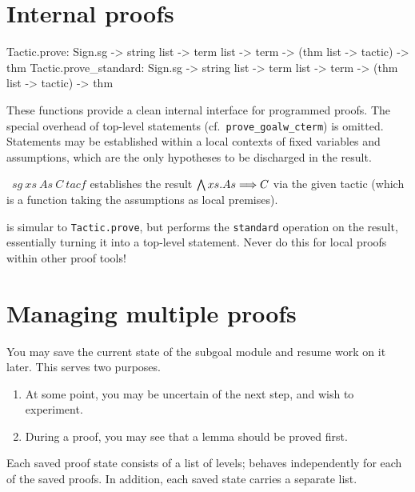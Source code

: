 \section{Internal proofs}

\begin{ttbox}
Tactic.prove: Sign.sg -> string list -> term list -> term ->
  (thm list -> tactic) -> thm
Tactic.prove_standard: Sign.sg -> string list -> term list -> term ->
  (thm list -> tactic) -> thm
\end{ttbox}

These functions provide a clean internal interface for programmed proofs.  The
special overhead of top-level statements (cf.\ \verb,prove_goalw_cterm,) is
omitted.  Statements may be established within a local contexts of fixed
variables and assumptions, which are the only hypotheses to be discharged in
the result.

\begin{ttdescription}
\item[\ttindexbold{Tactic.prove}~$sg~xs~As~C~tacf$] establishes the result
  $\bigwedge xs. As \Longrightarrow C$ via the given tactic (which is a function taking the
  assumptions as local premises).
  
\item[\ttindexbold{Tactic.prove_standard}] is simular to \verb,Tactic.prove,,
  but performs the \verb,standard, operation on the result, essentially
  turning it into a top-level statement.  Never do this for local proofs
  within other proof tools!

\end{ttdescription}


\section{Managing multiple proofs}
You may save the current state of the subgoal module and resume work on it
later.  This serves two purposes.  
\begin{enumerate}
\item At some point, you may be uncertain of the next step, and
wish to experiment.

\item During a proof, you may see that a lemma should be proved first.
\end{enumerate}
Each saved proof state consists of a list of levels;  behaves
independently for each of the saved proofs.  In addition, each saved state
carries a separate  list.

